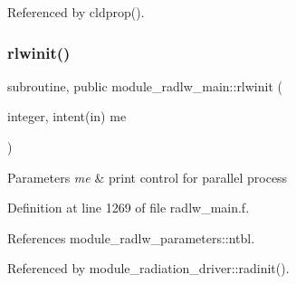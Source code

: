 Referenced by cldprop().

\mbox{\label{group__module__radlw__main_gaa9569479682c83b26584b7e9ee6841fa}} 
\subsubsection{\texorpdfstring{rlwinit()}{rlwinit()}}
{\footnotesize\ttfamily subroutine, public module\+\_\+radlw\+\_\+main\+::rlwinit (\begin{DoxyParamCaption}\item[{integer, intent(in)}]{me }\end{DoxyParamCaption})}


\begin{DoxyParams}{Parameters}
{\em me} & print control for parallel process \\
\hline
\end{DoxyParams}


Definition at line 1269 of file radlw\+\_\+main.\+f.



References module\+\_\+radlw\+\_\+parameters\+::ntbl.



Referenced by module\+\_\+radiation\+\_\+driver\+::radinit().

\mbox{\label{group__module__radlw__main_gab002119955eb2b82f16352459180f5ed}} 
